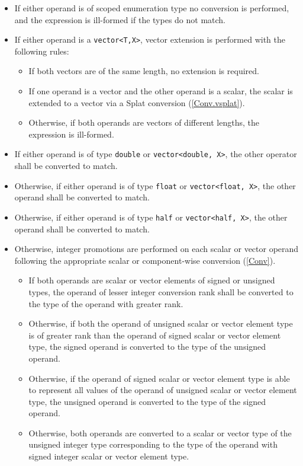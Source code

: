 \begin{itemize}
  \item If either operand is of scoped enumeration type no conversion is
  performed, and the expression is ill-formed if the types do not match.
  \item If either operand is a \texttt{vector<T,X>}, vector extension is
  performed with the following rules:
  \begin{itemize}
    \item If both vectors are of the same length, no extension is required.
    \item If one operand is a vector and the other operand is a scalar, the
    scalar is extended to a vector via a Splat conversion (\ref{Conv.vsplat}).
    \item Otherwise, if both operands are vectors of different lengths, the
    expression is ill-formed.
  \end{itemize}
  \item If either operand is of type \texttt{double} or \texttt{vector<double,
  X>}, the other operator shall be converted to match.
  \item Otherwise, if either operand is of type \texttt{float} or \texttt{vector<float,
  X>}, the other operand shall be converted to match.
  \item Otherwise, if either operand is of type \texttt{half} or \texttt{vector<half, X>},
  the other operand shall be converted to match.
  \item Otherwise, integer promotions are performed on each scalar or vector
  operand following the appropriate scalar or component-wise conversion
  (\ref{Conv}).
  \begin{itemize}
    \item If both operands are scalar or vector elements of signed or unsigned
    types, the operand of lesser integer conversion rank shall be converted to
    the type of the operand with greater rank.
    \item Otherwise, if both the operand of unsigned scalar or vector element
    type is of greater rank than the operand of signed scalar or vector element
    type, the signed operand is converted to the type of the unsigned operand.
    \item Otherwise, if the operand of signed scalar or vector element type is
    able to represent all values of the operand of unsigned scalar or vector
    element type, the unsigned operand is converted to the type of the signed
    operand.
    \item Otherwise, both operands are converted to a scalar or vector type of
    the unsigned integer type corresponding to the type of the operand with
    signed integer scalar or vector element type.
  \end{itemize}
\end{itemize}
